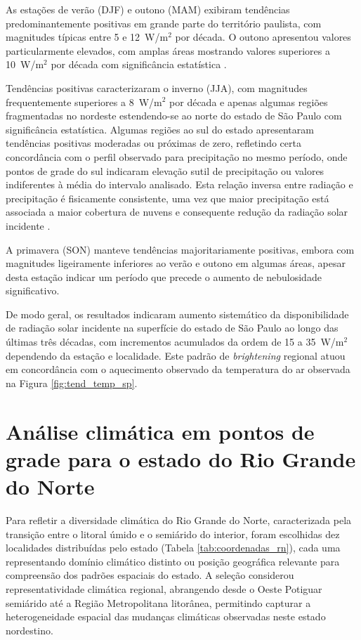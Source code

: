As estações de verão (DJF) e outono (MAM) exibiram tendências predominantemente positivas em grande parte do território paulista, com magnitudes típicas entre 5 e 12~W/m$^2$ por década. O outono apresentou valores particularmente elevados, com amplas áreas mostrando valores superiores a 10~W/m$^2$ por década com significância estatística \citep{yamasoe2017, wild2012}.

Tendências positivas caracterizaram o inverno (JJA), com magnitudes frequentemente superiores a 8~W/m$^2$ por década e apenas algumas regiões fragmentadas no nordeste estendendo-se ao norte do estado de São Paulo com significância estatística. Algumas regiões ao sul do estado apresentaram tendências positivas moderadas ou próximas de zero, refletindo certa concordância com o perfil observado para precipitação no mesmo período, onde pontos de grade do sul indicaram elevação sutil de precipitação ou valores indiferentes à média do intervalo analisado. Esta relação inversa entre radiação e precipitação é fisicamente consistente, uma vez que maior precipitação está associada a maior cobertura de nuvens e consequente redução da radiação solar incidente \citep{Trenberth2009}.

A primavera (SON) manteve tendências majoritariamente positivas, embora com magnitudes ligeiramente inferiores ao verão e outono em algumas áreas, apesar desta estação indicar um período que precede o aumento de nebulosidade significativo.

De modo geral, os resultados indicaram aumento sistemático da disponibilidade de radiação solar incidente na superfície do estado de São Paulo ao longo das últimas três décadas, com incrementos acumulados da ordem de 15 a 35~W/m$^2$ dependendo da estação e localidade. Este padrão de \textit{brightening} regional \citep{wild2012, yamasoe2021} atuou em concordância com o aquecimento observado da temperatura do ar observada na Figura \ref{fig:tend_temp_sp}.

\section{Análise climática em pontos de grade para o estado do Rio Grande do Norte}

Para refletir a diversidade climática do Rio Grande do Norte, caracterizada pela transição entre o litoral úmido e o semiárido do interior, foram escolhidas dez localidades distribuídas pelo estado (Tabela \ref{tab:coordenadas_rn}), cada uma representando domínio climático distinto ou posição geográfica relevante para compreensão dos padrões espaciais do estado. A seleção considerou representatividade climática regional, abrangendo desde o Oeste Potiguar semiárido até a Região Metropolitana litorânea, permitindo capturar a heterogeneidade espacial das mudanças climáticas observadas neste estado nordestino.

